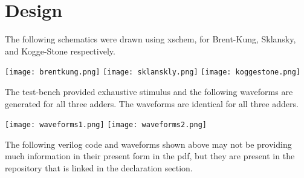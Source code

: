 \documentclass[10pt,a4paper]{article}
\begin{document}
\section{Design}
\noindent The following schematics were drawn using xschem, for Brent-Kung, Sklansky, and Kogge-Stone respectively.
\begin{center}
    \texttt{[image: brentkung.png]}
    \texttt{[image: sklanskly.png]}
    \texttt{[image: koggestone.png]}
\end{center}

\noindent The test-bench provided exhaustive stimulus and the following waveforms are generated for all three adders. The waveforms are identical for all three adders.

\begin{center}
    \texttt{[image: waveforms1.png]}
    \texttt{[image: waveforms2.png]}
\end{center}

\noindent The following verilog code and waveforms shown above may not be providing much information in their present form in the pdf, but they are present in the repository that is linked in the declaration section.
\end{document}

